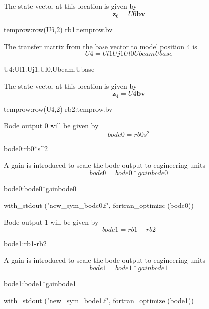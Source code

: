 \documentclass[12pt]{article}
\newcommand{\M}[1]{\mathbf{#1}}
\begin{document}
The state vector at this location is given by
\begin{equation}
	\M{z}_{6}=U6 \M{bv}
\end{equation}
\begin{maxima-noout}
	temprow:row(U6,2)
	rb1:temprow.bv
\end{maxima-noout}
The transfer matrix from the base vector to model position 4 is
\begin{equation}
	U4=Ul1 Uj1 Ul0 Ubeam Ubase
\end{equation}
\begin{maxima-noout}
	U4:Ul1.Uj1.Ul0.Ubeam.Ubase
\end{maxima-noout}
The state vector at this location is given by
\begin{equation}
	\M{z}_{4}=U4 \M{bv}
\end{equation}
\begin{maxima-noout}
	temprow:row(U4,2)
	rb2:temprow.bv
\end{maxima-noout}
Bode output 0 will be given by
\begin{equation}
	bode0=rb0 s^2
\end{equation}
\begin{maxima-noout}
bode0:rb0*s^2
\end{maxima-noout}
A gain is introduced to scale the bode output to engineering units
\begin{equation}
	bode0=bode0*gainbode0
\end{equation}
\begin{maxima-noout}
	bode0:bode0*gainbode0
\end{maxima-noout}
\begin{maxima-noout}
	with_stdout ("new_sym_bode0.f", fortran_optimize (bode0))
\end{maxima-noout}
Bode output 1 will be given by
\begin{equation}
	bode1=rb1-rb2
\end{equation}
\begin{maxima-noout}
bode1:rb1-rb2
\end{maxima-noout}
A gain is introduced to scale the bode output to engineering units
\begin{equation}
	bode1=bode1*gainbode1
\end{equation}
\begin{maxima-noout}
	bode1:bode1*gainbode1
\end{maxima-noout}
\begin{maxima-noout}
	with_stdout ("new_sym_bode1.f", fortran_optimize (bode1))
\end{maxima-noout}
\end{document}
